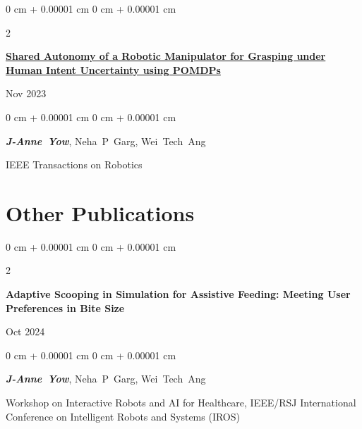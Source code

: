 \documentclass[10pt, letterpaper]{article}
\newenvironment{onecolentry}{
    \begin{adjustwidth}{
        0 cm + 0.00001 cm
    }{
        0 cm + 0.00001 cm
    }
}{
    \end{adjustwidth}
} %
\newenvironment{twocolentry}[2][]{
    \onecolentry
    \def\secondColumn{#2}
    \setcolumnwidth{\fill, 4.5 cm}
    \begin{paracol}{2}
}{
    \switchcolumn \raggedleft \secondColumn
    \end{paracol}
    \endonecolentry
} %
\begin{document}
        \vspace{0.2 cm}

        \begin{samepage}
            \begin{twocolentry}{
                Nov 2023
            }
                \textbf{\href{https://ieeexplore.ieee.org/document/10323205}{Shared Autonomy of a Robotic Manipulator for Grasping under Human Intent Uncertainty using POMDPs}}
            \end{twocolentry}

            \vspace{0.10 cm}
            
            \begin{onecolentry}
                \mbox{\textbf{\textit{J-Anne Yow}}}, \mbox{Neha P Garg}, \mbox{Wei Tech Ang}

                \vspace{0.10 cm}
                
        IEEE Transactions on Robotics\end{onecolentry}
        \end{samepage}


    
    \section{Other Publications}



        
        \begin{samepage}
            \begin{twocolentry}{
                Oct 2024
            }
                \textbf{Adaptive Scooping in Simulation for Assistive Feeding: Meeting User Preferences in Bite Size}
            \end{twocolentry}

            \vspace{0.10 cm}
            
            \begin{onecolentry}
                \mbox{\textbf{\textit{J-Anne Yow}}}, \mbox{Neha P Garg}, \mbox{Wei Tech Ang}

                \vspace{0.10 cm}
                
        Workshop on Interactive Robots and AI for Healthcare, IEEE/RSJ International Conference on Intelligent Robots and Systems (IROS)\end{onecolentry}
        \end{samepage}
\end{document}
